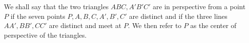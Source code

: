 We shall say that the two triangles $ABC, A'B'C'$ are in perspective from a point $P$ if the seven points $P, A, B, C, A', B', C'$ are distinct and if the three lines $AA', BB', CC'$ are distinct and meet at $P$. We then refer to $P$ as the center of perspective of the triangles.
